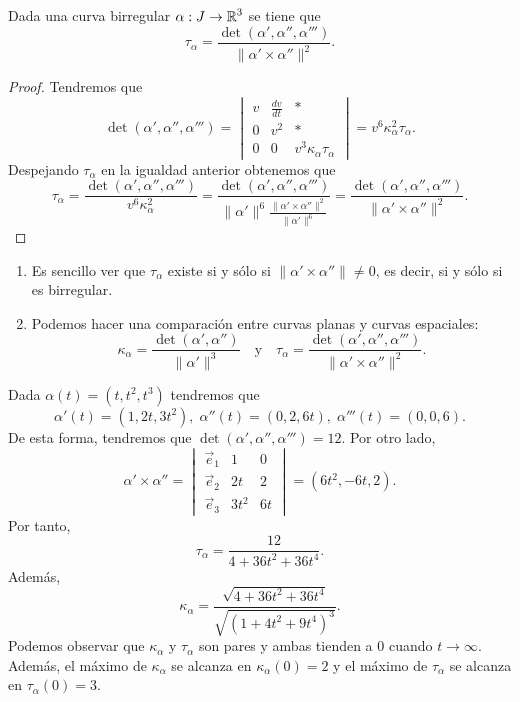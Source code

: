 \begin{colorary}
Dada una curva birregular $\displaystyle \alpha : J \to \mathbb{R}^{3} $ se tiene que 
\[\tau_{\alpha }=\frac{\det\left(\alpha', \alpha'', \alpha'''\right)}{\|\alpha' \times \alpha''\|^{2}} .\]
\end{colorary}
\begin{proof}
Tendremos que 
\[\det\left(\alpha', \alpha'', \alpha'''\right)=\begin{vmatrix} v & \frac{dv}{dt} & * \\ 0 & v^{2} & * \\ 0 & 0 & v^{3}\kappa_{\alpha }\tau_{\alpha } \end{vmatrix} =v^{6}\kappa_{\alpha }^{2}\tau_{\alpha} .\]
Despejando $\displaystyle \tau_{\alpha } $ en la igualdad anterior obtenemos que 
\[\tau_{\alpha }=\frac{\det\left(\alpha', \alpha'', \alpha'''\right)}{v^{6}\kappa_{\alpha }^{2}}=\frac{\det\left(\alpha', \alpha'', \alpha'''\right)}{\|\alpha'\|^{6}\frac{\|\alpha'\times\alpha''\|^{2}}{\|\alpha'\|^{6}}}=\frac{\det\left(\alpha', \alpha'', \alpha'''\right)}{\|\alpha' \times \alpha''\|^{2}} .\]
\end{proof}
\begin{observation}
\begin{enumerate}
\item Es sencillo ver que $\displaystyle \tau_{\alpha } $ existe si y sólo si $\displaystyle \|\alpha' \times \alpha''\|\neq 0 $, es decir, si y sólo si es birregular. 
\item Podemos hacer una comparación entre curvas planas y curvas espaciales:
	\[\kappa_{\alpha }=\frac{\det\left(\alpha', \alpha''\right)}{\|\alpha'\|^{3}} \quad \text{y} \quad \tau_{\alpha }=\frac{\det\left(\alpha', \alpha '',\alpha '''\right)}{\|\alpha'\times\alpha''\|^{2}} .\]
\end{enumerate}
\end{observation}
\begin{eg}
Dada $\displaystyle \alpha\left(t\right)=\left(t, t ^{2}, t ^{3}\right) $ tendremos que 
\[\alpha'\left(t\right)=\left(1, 2t, 3t ^{2}\right), \; \alpha''\left(t\right)=\left(0,2,6t\right), \; \alpha'''\left(t\right)=\left(0,0,6\right) .\]
De esta forma, tendremos que $\displaystyle \det\left(\alpha', \alpha'', \alpha'''\right)=12 $. Por otro lado,
\[\alpha' \times \alpha'' = \begin{vmatrix} \vec{e}_{1} & 1 & 0 \\ \vec{e}_{2} & 2t & 2 \\ \vec{e}_{3} & 3t ^{2} & 6t \end{vmatrix} =\left(6t ^{2}, - 6t, 2\right) .\]
Por tanto, 
\[\tau_{\alpha }=\frac{12}{4 + 36t ^{2} + 36t ^{4}} .\]
Además, 
\[\kappa_{\alpha }=\frac{\sqrt{4 + 36t ^{2}+36t ^{4}}}{\sqrt{\left(1 + 4t ^{2} + 9t ^{4}\right)^{3}}} .\]
Podemos observar que $\displaystyle \kappa_{\alpha } $ y $\displaystyle \tau_{\alpha } $ son pares y ambas tienden a 0 cuando $\displaystyle t \to \infty $. Además, el máximo de $\displaystyle \kappa_{\alpha } $ se alcanza en $\displaystyle \kappa_{\alpha }\left(0\right)=2 $ y el máximo de $\displaystyle \tau_{\alpha } $ se alcanza en $\displaystyle \tau_{\alpha }\left(0\right)=3 $. 
\end{eg}
